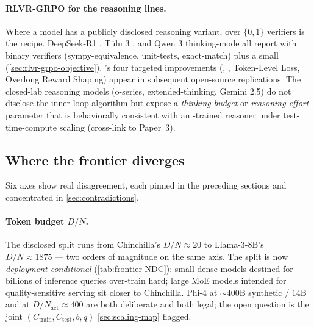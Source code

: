 \paragraph{RLVR-GRPO for the reasoning lines.}
Where a model has a publicly disclosed reasoning variant,  over
$\{0, 1\}$ verifiers is the recipe. DeepSeek-R1 \citep{deepseek-r1},
Tülu 3 \citep{tulu3}, and Qwen 3 thinking-mode \citep{qwen3} all
report  with binary verifiers (sympy-equivalence, unit-tests,
exact-match) plus a small 
(\cref{sec:rlvr-grpo-objective}). 's four targeted improvements
\citep{dapo2025} (, , Token-Level Loss,
Overlong Reward Shaping) appear in subsequent open-source replications.
The closed-lab reasoning models (o-series,  extended-thinking,
Gemini 2.5) do not disclose the inner-loop algorithm but expose a
\emph{thinking-budget} or \emph{reasoning-effort} parameter that is
behaviorally consistent with an -trained reasoner under
test-time-compute scaling (cross-link to Paper~3).

\subsection{Where the frontier diverges}
\label{sec:snap-disagree}

Six axes show real disagreement, each pinned in the preceding
sections and concentrated in \cref{sec:contradictions}.

\paragraph{Token budget $D / N$.}
The disclosed split runs from Chinchilla's $D / N \approx 20$
\citep[\S 4.1]{hoffmann2022-chinchilla} to Llama-3-8B's
$D / N \approx 1875$ \citep{meta-llama3} --- two orders of magnitude
on the same axis. The split is now \emph{deployment-conditional}
(\cref{tab:frontier-NDC}): small dense models destined for billions
of inference queries over-train hard; large MoE models intended for
quality-sensitive serving sit closer to Chinchilla. Phi-4 at
$\sim\!400$B synthetic / $14$B  and  at
$D / N_{\text{act}} \approx 400$ are both deliberate and both legal;
the open question is the joint $(C_{\text{train}}, C_{\text{test}}, b, q)$
 \cref{sec:scaling-map} flagged.

